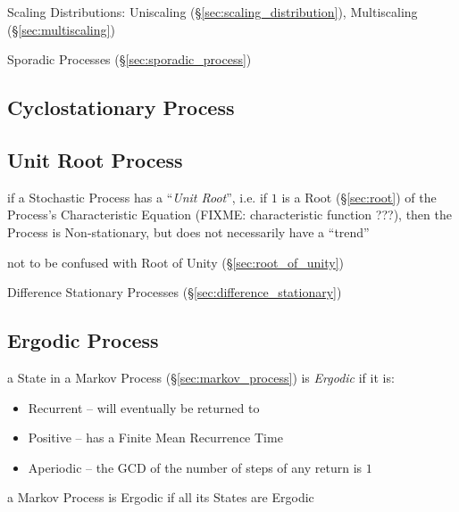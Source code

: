 \fist Scaling Distributions: Uniscaling
(\S\ref{sec:scaling_distribution}), Multiscaling (\S\ref{sec:multiscaling})

\fist Sporadic Processes (\S\ref{sec:sporadic_process})



\subsection{Cyclostationary Process}\label{sec:cyclostationary_process}

\subsection{Unit Root Process}\label{sec:unit_root}

if a Stochastic Process has a ``\emph{Unit Root}'', i.e. if $1$ is a Root
(\S\ref{sec:root}) of the Process's Characteristic Equation (FIXME:
characteristic function ???), then the Process is Non-stationary, but does not
necessarily have a ``trend''

\fist not to be confused with Root of Unity (\S\ref{sec:root_of_unity})

Difference Stationary Processes (\S\ref{sec:difference_stationary})



\subsection{Ergodic Process}\label{sec:ergodic_process}

a State in a Markov Process (\S\ref{sec:markov_process}) is \emph{Ergodic} if it
is:
\begin{itemize}
  \item Recurrent -- will eventually be returned to
  \item Positive -- has a Finite Mean Recurrence Time
  \item Aperiodic -- the GCD of the number of steps of any return is $1$
\end{itemize}
a Markov Process is Ergodic if all its States are Ergodic

